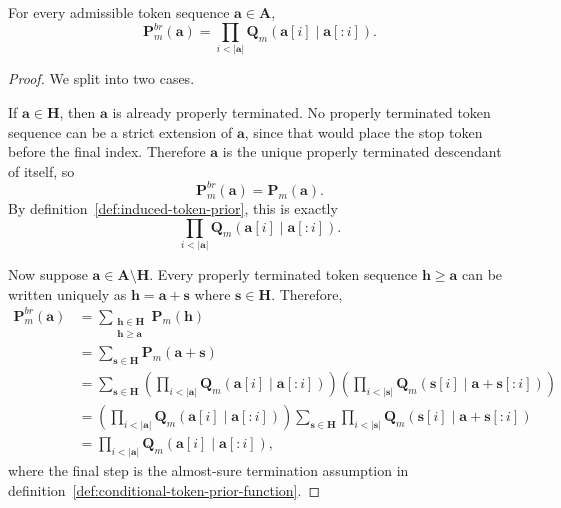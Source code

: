 \begin{lemma}
\label{lemma:token-branch-prior-product}
    For every admissible token sequence $\mathbf{a} \in \mathbf{A}$,
    \[
    \mathbf{P}^{br}_m(\mathbf{a})
    =
    \prod_{i < |\mathbf{a}|} \mathbf{Q}_m(\mathbf{a}[i] \mid \mathbf{a}[:i]).
    \]
\end{lemma}
\begin{proof}
    We split into two cases.

    If $\mathbf{a}\in\mathbf{H}$, then $\mathbf{a}$ is already properly terminated.
    No properly terminated token sequence can be a strict extension of $\mathbf{a}$,
    since that would place the stop token before the final index. Therefore
    $\mathbf{a}$ is the unique properly terminated descendant of itself, so
    \[
    \mathbf{P}^{br}_m(\mathbf{a}) = \mathbf{P}_m(\mathbf{a}).
    \]
    By definition~\ref{def:induced-token-prior}, this is exactly
    \[
    \prod_{i < |\mathbf{a}|} \mathbf{Q}_m(\mathbf{a}[i] \mid \mathbf{a}[:i]).
    \]

    Now suppose $\mathbf{a} \in \mathbf{A}\setminus\mathbf{H}$.
    Every properly terminated token sequence $\mathbf{h} \geq \mathbf{a}$ can be written
    uniquely as $\mathbf{h}=\mathbf{a}+\mathbf{s}$ where $\mathbf{s}\in\mathbf{H}$.
    Therefore,
    \begin{align*}
    \mathbf{P}^{br}_m(\mathbf{a})
    &= \sum_{\substack{\mathbf{h} \in \mathbf{H} \\ \mathbf{h} \geq \mathbf{a}}} \mathbf{P}_m(\mathbf{h}) \\
    &= \sum_{\mathbf{s} \in \mathbf{H}} \mathbf{P}_m(\mathbf{a}+\mathbf{s}) \\
    &= \sum_{\mathbf{s} \in \mathbf{H}}
    \left(
        \prod_{i < |\mathbf{a}|} \mathbf{Q}_m(\mathbf{a}[i] \mid \mathbf{a}[:i])
    \right)
    \left(
        \prod_{i < |\mathbf{s}|} \mathbf{Q}_m(\mathbf{s}[i] \mid \mathbf{a}+\mathbf{s}[:i])
    \right) \\
    &=
    \left(
        \prod_{i < |\mathbf{a}|} \mathbf{Q}_m(\mathbf{a}[i] \mid \mathbf{a}[:i])
    \right)
    \sum_{\mathbf{s} \in \mathbf{H}}
    \prod_{i < |\mathbf{s}|} \mathbf{Q}_m(\mathbf{s}[i] \mid \mathbf{a}+\mathbf{s}[:i]) \\
    &=
    \prod_{i < |\mathbf{a}|} \mathbf{Q}_m(\mathbf{a}[i] \mid \mathbf{a}[:i]),
    \end{align*}
    where the final step is the almost-sure termination assumption in
    definition~\ref{def:conditional-token-prior-function}.
\end{proof}

